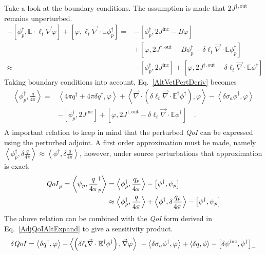 \documentclass[12pt]{report}
\newcommand{\bra}{\left\langle}
\newcommand{\ket}{\right\rangle}
\newcommand{\sbra}{\left[}
\newcommand{\sket}{\right]}
\renewcommand{\div}{\vec{\nabla} \cdot}
\newcommand{\grad}{\vec{\nabla}}
\newcommand{\Edd}{\mathbb{E}}
\newcommand{\siga}{\sigma_a}
\newcommand{\isigt}{\ell_t}
\newcommand{\angSource}{\frac{q}{4 \pi}}
\newcommand{\angSourcep}{\frac{q_p}{4 \pi}}
\newcommand{\scalResp}{q^\dag}
\newcommand{\qoi}{{\it QoI}\xspace}
\begin{document}
Take a look at the boundary conditions. The assumption is made that $2 J^{\dag,\text{out}}$ remains unperturbed.
\begin{equation}
\begin{split}
 - \sbra \phi^\dag_p, \Edd \cdot \isigt \grad \varphi \sket  + \sbra \varphi, \isigt \div \Edd \phi_p^\dag \sket 
=&- \sbra \phi_p^\dag, 2J^{\text{inc}} - B \varphi \sket \\ 
&+ \sbra \varphi, 2 J^{\dag,\text{out}} - B \phi_p^\dag - \delta \isigt \div \Edd \phi_p^\dag \sket \\
\approx&- \sbra \phi_p^\dag, 2J^{\text{inc}} \sket + \sbra \varphi , 2 J^{\dag,\text{out}} - \delta \isigt \div \Edd \phi^\dag \sket 
\end{split}
\end{equation}
Taking boundary conditions into account, Eq.~\eqref{AltVetPertDeriv} becomes
\begin{equation}
\label{AltVetPertDeriv2}
\begin{split}
 \bra  \phi^\dag_p , \angSource \ket  =& \bra 4 \pi \scalResp + 4 \pi\delta \scalResp , \varphi \ket + \bra\div \left( \delta \isigt \div \Edd^\dag \phi^\dag  \right), \varphi \ket 
- \bra \delta \siga \phi^\dag , \varphi \ket \\
&- \sbra \phi_p^\dag, 2J^{\text{inc}} \sket + \sbra \varphi , 2 J^{\dag,\text{out}} - \delta \isigt \div \Edd \phi^\dag \sket  \quad . \\
\end{split}
\end{equation} 
A important relation to keep in mind that the perturbed \qoi can be expressed using the perturbed adjoint. A first order approximation must be made, namely $\bra \phi^\dag_p , \delta \angSource \ket \approx \bra \phi^\dag , \delta \angSource \ket$, however, under source perturbations that approximation is exact.
\begin{equation}
\begin{split}
\qoi_p  = \bra \psi_p , \angSource_p^\dag \ket &= \bra \phi^\dag_p , \angSourcep \ket - \sbra \psi^\dag,  \psi_p \sket \\
&\approx \bra \phi^\dag_p , \angSource \ket + \bra \phi^\dag , \delta \angSourcep \ket - \sbra \psi^\dag,  \psi_p \sket \\
\end{split} 
\end{equation}
The above relation can be combined with the \qoi form derived in Eq.~\eqref{AdjQoIAltExpand} to give a sensitivity product. 
\begin{equation}
\delta \qoi = \bra \delta q^\dag, \varphi \ket - \bra\left( \delta \isigt \div \Edd^\dag \phi^\dag  \right), \grad \varphi \ket \
- \bra \delta \siga \phi^\dag , \varphi \ket + \bra \delta q , \phi \ket - \sbra \delta \psi^{\text{inc}}, \psi^\dag \sket_-
\end{equation}
\end{document}
